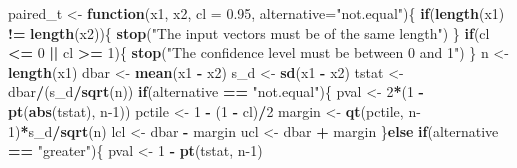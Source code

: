 \documentclass[
]{krantz}
\makeatletter
\newenvironment{Shaded}{\begin{snugshade}}{\end{snugshade}}
\newcommand{\ControlFlowTok}[1]{\textcolor[rgb]{0.27,0.27,0.27}{\textbf{#1}}}
\newcommand{\DataTypeTok}[1]{\textcolor[rgb]{0.27,0.27,0.27}{#1}}
\newcommand{\DecValTok}[1]{\textcolor[rgb]{0.06,0.06,0.06}{#1}}
\newcommand{\FloatTok}[1]{\textcolor[rgb]{0.06,0.06,0.06}{#1}}
\newcommand{\KeywordTok}[1]{\textcolor[rgb]{0.27,0.27,0.27}{\textbf{#1}}}
\newcommand{\NormalTok}[1]{#1}
\newcommand{\OperatorTok}[1]{\textcolor[rgb]{0.43,0.43,0.43}{\textbf{#1}}}
\newcommand{\StringTok}[1]{\textcolor[rgb]{0.5,0.5,0.5}{#1}}
\newenvironment{kframe}{%
\medskip{}
\setlength{\fboxsep}{.8em}
 \def\at@end@of@kframe{}%
 \ifinner\ifhmode%
  \def\at@end@of@kframe{\end{minipage}}%
  \begin{minipage}{\columnwidth}%
 \fi\fi%
 \def\FrameCommand##1{\hskip\@totalleftmargin \hskip-\fboxsep
 \colorbox{shadecolor}{##1}\hskip-\fboxsep
     \hskip-\linewidth \hskip-\@totalleftmargin \hskip\columnwidth}%
 \MakeFramed {\advance\hsize-\width
   \@totalleftmargin\z@ \linewidth\hsize
   \@setminipage}}%
 {\par\unskip\endMakeFramed%
 \at@end@of@kframe}
\renewenvironment{Shaded}{\begin{kframe}}{\end{kframe}}
\makeatother
\begin{document}
\begin{Shaded}
\begin{Highlighting}[]
\NormalTok{paired\_t \textless{}{-}}\StringTok{ }\ControlFlowTok{function}\NormalTok{(x1, x2, }\DataTypeTok{cl =} \FloatTok{0.95}\NormalTok{, }\DataTypeTok{alternative=}\StringTok{"not.equal"}\NormalTok{)\{}
    \ControlFlowTok{if}\NormalTok{(}\KeywordTok{length}\NormalTok{(x1) }\OperatorTok{!=}\StringTok{ }\KeywordTok{length}\NormalTok{(x2))\{}
        \KeywordTok{stop}\NormalTok{(}\StringTok{"The input vectors must be of the same length"}\NormalTok{)}
\NormalTok{        \}}
    \ControlFlowTok{if}\NormalTok{(cl }\OperatorTok{\textless{}=}\StringTok{ }\DecValTok{0} \OperatorTok{||}\StringTok{ }\NormalTok{cl }\OperatorTok{\textgreater{}=}\StringTok{ }\DecValTok{1}\NormalTok{)\{}
        \KeywordTok{stop}\NormalTok{(}\StringTok{"The confidence level must be between 0 and 1"}\NormalTok{)}
\NormalTok{        \}}
\NormalTok{    n \textless{}{-}}\StringTok{ }\KeywordTok{length}\NormalTok{(x1)}
\NormalTok{    dbar \textless{}{-}}\StringTok{ }\KeywordTok{mean}\NormalTok{(x1 }\OperatorTok{{-}}\StringTok{ }\NormalTok{x2)}
\NormalTok{    s\_d \textless{}{-}}\StringTok{ }\KeywordTok{sd}\NormalTok{(x1 }\OperatorTok{{-}}\StringTok{ }\NormalTok{x2)}
\NormalTok{    tstat \textless{}{-}}\StringTok{ }\NormalTok{dbar}\OperatorTok{/}\NormalTok{(s\_d}\OperatorTok{/}\KeywordTok{sqrt}\NormalTok{(n))}
    \ControlFlowTok{if}\NormalTok{(alternative }\OperatorTok{==}\StringTok{ "not.equal"}\NormalTok{)\{}
\NormalTok{        pval \textless{}{-}}\StringTok{ }\DecValTok{2}\OperatorTok{*}\NormalTok{(}\DecValTok{1} \OperatorTok{{-}}\StringTok{ }\KeywordTok{pt}\NormalTok{(}\KeywordTok{abs}\NormalTok{(tstat), n}\DecValTok{{-}1}\NormalTok{))}
\NormalTok{        pctile \textless{}{-}}\StringTok{ }\DecValTok{1} \OperatorTok{{-}}\StringTok{ }\NormalTok{(}\DecValTok{1} \OperatorTok{{-}}\StringTok{ }\NormalTok{cl)}\OperatorTok{/}\DecValTok{2}
\NormalTok{        margin \textless{}{-}}\StringTok{ }\KeywordTok{qt}\NormalTok{(pctile, n}\DecValTok{{-}1}\NormalTok{)}\OperatorTok{*}\NormalTok{s\_d}\OperatorTok{/}\KeywordTok{sqrt}\NormalTok{(n)}
\NormalTok{        lcl \textless{}{-}}\StringTok{ }\NormalTok{dbar }\OperatorTok{{-}}\StringTok{ }\NormalTok{margin}
\NormalTok{        ucl \textless{}{-}}\StringTok{ }\NormalTok{dbar }\OperatorTok{+}\StringTok{ }\NormalTok{margin}
\NormalTok{    \}}\ControlFlowTok{else} \ControlFlowTok{if}\NormalTok{(alternative }\OperatorTok{==}\StringTok{ "greater"}\NormalTok{)\{}
\NormalTok{        pval \textless{}{-}}\StringTok{ }\DecValTok{1} \OperatorTok{{-}}\StringTok{ }\KeywordTok{pt}\NormalTok{(tstat, n}\DecValTok{{-}1}\NormalTok{)}

\end{Highlighting}
\end{Shaded}
\end{document}
